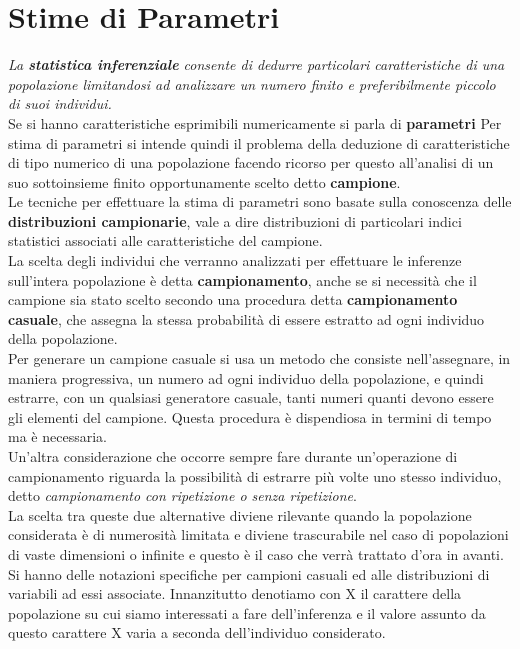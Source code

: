 \documentclass[a4paper,12pt, oneside]{book}
\begin{document}
\chapter{Stime di Parametri}
\textit{La \textbf{statistica inferenziale} consente di dedurre particolari caratteristiche di una
  popolazione limitandosi ad analizzare un numero finito e preferibilmente piccolo di suoi individui.}\\
Se si hanno caratteristiche esprimibili numericamente si parla di \textbf{parametri}
Per stima di parametri si intende quindi il problema della deduzione di caratteristiche
di tipo numerico di una popolazione facendo ricorso per questo all’analisi di un suo
sottoinsieme finito opportunamente scelto detto \textbf{campione}.\\
Le tecniche per effettuare la stima di parametri sono basate sulla conoscenza delle \textbf{distribuzioni campionarie}, vale a dire distribuzioni di particolari indici
statistici associati alle caratteristiche del campione.\\
La scelta degli individui che verranno analizzati per effettuare le
inferenze sull’intera popolazione è detta \textbf{campionamento}, anche se si necessità
che il campione sia stato scelto secondo una procedura detta \textbf{campionamento casuale},
che assegna la stessa probabilità di essere estratto ad ogni individuo della
popolazione.\\
Per generare un campione casuale si usa un metodo che consiste nell’assegnare, in maniera progressiva, un numero ad ogni individuo della
popolazione, e quindi estrarre, con un qualsiasi generatore casuale, tanti numeri
quanti devono essere gli elementi del campione. Questa procedura è dispendiosa in termini di tempo ma è necessaria.\\
Un’altra considerazione che occorre sempre fare durante un’operazione di
campionamento riguarda la possibilità di estrarre più volte uno stesso individuo,
detto \textit{campionamento con ripetizione o senza ripetizione}.\\
La scelta tra queste due alternative diviene rilevante quando la popolazione
considerata è di numerosità limitata e diviene trascurabile nel caso di popolazioni di
vaste dimensioni o infinite e questo è il caso che verrà trattato d’ora in avanti.
Si hanno delle notazioni specifiche per campioni casuali
ed alle distribuzioni di variabili ad essi associate.
Innanzitutto denotiamo con X il carattere della popolazione su cui siamo interessati
a fare dell’inferenza e il valore assunto da questo carattere X varia a seconda dell’individuo considerato.
\end{document}
